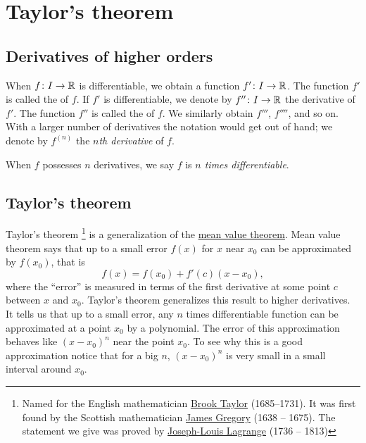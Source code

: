 \sectionnewpage
\section{Taylor's theorem}
\label{sec:taylor}


\subsection{Derivatives of higher orders}

When $f \colon I \to {\mathbb{R}}$ is differentiable, we obtain a function
$f' \colon I \to {\mathbb{R}}$.  The function
$f'$ is called the \emph{} of $f$.
If $f'$ is differentiable, we denote by
$f'' \colon I \to {\mathbb{R}}$ the derivative of $f'$.  The function $f''$
is called the \emph{} of $f$.
We similarly obtain
$f'''$, $f''''$, and so on.
With a larger number of derivatives
the notation would get out of hand; we denote
by $f^{(n)}$ the \emph{$n$th derivative} of $f$.

When $f$ possesses $n$ derivatives, we say $f$ is
\emph{$n$ times differentiable}.

\subsection{Taylor's theorem}

Taylor's theorem%
\footnote{Named for the English mathematician
\href{http://en.wikipedia.org/wiki/Brook_Taylor}{Brook Taylor}
(1685--1731).
It was first found by
the Scottish mathematician
\href{http://en.wikipedia.org/wiki/James_Gregory_(mathematician)}{James Gregory}
(1638 -- 1675).  The statement we give
was proved by
\href{http://en.wikipedia.org/wiki/Lagrange}{Joseph-Louis Lagrange}
(1736 -- 1813)}
is a generalization of the \hyperref[thm:mvt]{mean value theorem}.
Mean value theorem says that up to a small error $f(x)$ for $x$ near $x_0$ can be
approximated by $f(x_0)$, that is
\begin{equation*}
f(x) = f(x_0) + f'(c)(x-x_0),
\end{equation*}
where the ``error'' is measured in terms of the first derivative
at some point $c$ between $x$ and $x_0$.
Taylor's theorem generalizes this result to higher derivatives.
It tells us that up to a small error, any $n$
times differentiable function can be approximated at a point $x_0$
by a polynomial.  The
error of this approximation behaves like ${(x-x_0)}^{n}$ near the point $x_0$.
To see why this is a good approximation notice that for a big $n$, 
${(x-x_0)}^n$ is very small in a small interval around $x_0$.

